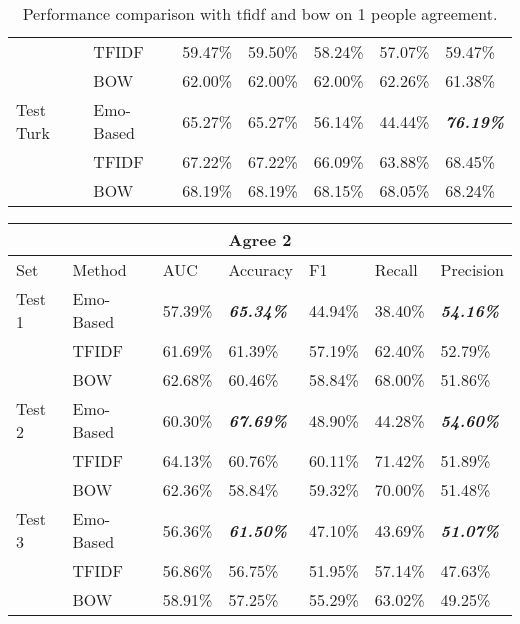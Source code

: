 \documentclass[12pt,a4paper]{report}
\theoremstyle{definition}
\begin{document}
\begin{CJK}{UTF8}{bsmi}
\begin{table}[H]
\begin{tabular}{l | l | l | l | l | l | l}
                 & TFIDF & 59.47\% & 59.50\% & 58.24\% & 57.07\% & 59.47\%\\
                 & BOW & 62.00\% & 62.00\% & 62.00\% & 62.26\% & 61.38\%\\
                \hline
                Test Turk & Emo-Based & 65.27\% & 65.27\% & 56.14\% & 44.44\% & \textit{\textbf{76.19\%}}\\
                 & TFIDF & 67.22\% & 67.22\% & 66.09\% & 63.88\% & 68.45\%\\
                 & BOW & 68.19\% & 68.19\% & 68.15\% & 68.05\% & 68.24\%\\
                \hline
            \end{tabular}
            \caption{Performance comparison with tfidf and bow on 1 people agreement.}
            \label{tab:tfidf_bow_agree1}
        \end{table}
        \begin{table}[H]
            \centering
            \begin{tabular}{l | l | l | l | l | l | l}
                \hline
                \multicolumn{7}{c}{\textbf{Agree 2}} \\
                \hline
                Set & Method & AUC & Accuracy & F1 & Recall & Precision \\
                \hline \hline
                Test 1 & Emo-Based & 57.39\% & \textit{\textbf{65.34\%}} & 44.94\% & 38.40\% & \textit{\textbf{54.16\%}}\\
                 & TFIDF & 61.69\% & 61.39\% & 57.19\% & 62.40\% & 52.79\%\\
                 & BOW & 62.68\% & 60.46\% & 58.84\% & 68.00\% & 51.86\%\\
                \hline
                Test 2 & Emo-Based & 60.30\% & \textit{\textbf{67.69\%}} & 48.90\% & 44.28\% & \textit{\textbf{54.60\%}}\\
                 & TFIDF & 64.13\% & 60.76\% & 60.11\% & 71.42\% & 51.89\%\\
                 & BOW & 62.36\% & 58.84\% & 59.32\% & 70.00\% & 51.48\%\\
                \hline
                Test 3 & Emo-Based & 56.36\% & \textit{\textbf{61.50\%}} & 47.10\% & 43.69\% & \textit{\textbf{51.07\%}}\\
                 & TFIDF & 56.86\% & 56.75\% & 51.95\% & 57.14\% & 47.63\%\\
                 & BOW & 58.91\% & 57.25\% & 55.29\% & 63.02\% & 49.25\%\\

\end{tabular}
\end{table}
\end{CJK}
\end{document}
